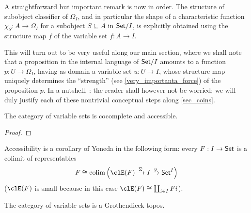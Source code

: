\begin{remark}
	A straightforward but important remark is now in order. The structure of subobject classifier of $\Omega_I$, and in particular the shape of a characteristic function $\chi_S : A \to \Omega_I$ for a subobject $S\subseteq A$ in $\mathsf{Set}/I$, is explicitly obtained using the structure map $f$ of the variable set $f : A\to I$. 

	This will turn out to be very useful along our main section, where we shall note that a proposition in the internal language of $\mathsf{Set}/I$ amounts to a function $p : U \to \Omega_I$, having as domain a variable set $u : U \to I$, whose structure map uniquely determines the ``strength'' (see \autoref{very_importanta_force}) of the proposition $p$. In a nutshell, : the reader shall however not be worried; we will duly justify each of these nontrivial conceptual steps along \autoref{sec_coins}.
\end{remark}
\begin{proposition}
	The category of variable sets is cocomplete and accessible.
\end{proposition}
\begin{proof}

\end{proof}
Accessibility is a corollary of Yoneda in the following form: every $F : I \to \mathsf{Set}$ is a colimit of representables
\[
	F \cong \colim\Big(\clE(F) \xto{\Sigma} I \xto{y} \Set^I\Big)
\]
($\clE(F)$ is small because in this case $\clE(F)\cong\coprod_{i\in I}Fi$).
\begin{corollary}
	The category of variable sets is a Grothendieck topos.
\end{corollary}
